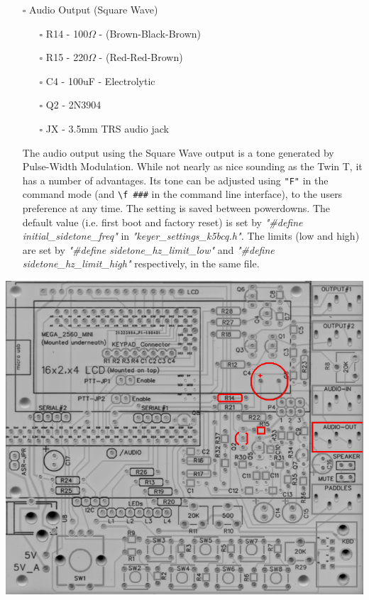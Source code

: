 \documentclass[11pt]{article}
\begin{document}
\newpage
\begin{itemize}
\item[{$\square$}] Audio Output (Square Wave)
\begin{itemize}
\item[{$\square$}] R14 - 100\(\Omega\) - (Brown-Black-Brown)
\item[{$\square$}] R15 - 220\(\Omega\) - (Red-Red-Brown)
\item[{$\square$}] C4 - 100uF - Electrolytic
\item[{$\square$}] Q2 - 2N3904
\item[{$\square$}] JX - 3.5mm TRS audio jack
\end{itemize}

The audio output using the Square Wave output is a tone generated by Pulse-Width Modulation.  While not nearly as nice sounding as the Twin T, it has a number of advantages.  Its tone can be adjusted using \texttt{"F"} in the command mode (and \texttt{\textbackslash{}f \#\#\#} in the command line interface), to the users preference at any time.  The setting is saved between powerdowns.  The default value (i.e. first boot and factory reset) is set by \emph{"\#define initial\_sidetone\_freq"} in \emph{"keyer\_settings\_k5bcq.h".}  The limits (low and high) are set by \emph{"\#define sidetone\_hz\_limit\_low"} and \emph{"\#define sidetone\_hz\_limit\_high"} respectively, in the same file.
\end{itemize}
\begin{center}
\includegraphics[width=.9\linewidth]{../png/3.3/pcb-top-audio-output-square-wave.png}
\end{center}
\end{document}
